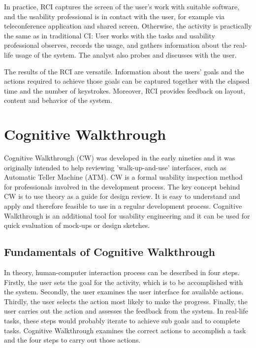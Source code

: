 \documentclass[12pt,a4paper,oneside,pdftex]{report}
\begin{document}
In practice, RCI captures the screen of the user's work with suitable software, and the usability professional is in contact with the user, for example via teleconference application and shared screen. Otherwise, the activity is practically the same as in traditional CI: User works with the tasks and usability professional observes, records the usage, and gathers information about the real-life usage of the system. The analyst also probes and discusses with the user. \citep{RefWorks:32}

The results of the RCI are versatile. Information about the users' goals and the actions required to achieve those goals can be captured together with the elapsed time and the number of keystrokes. Moreover, RCI provides feedback on layout, content and behavior of the system. \citep{RefWorks:32}
 
\section{Cognitive Walkthrough}
\label{sec:cognitivewalkthrough}

Cognitive Walkthrough (CW) was developed in the early nineties and it was originally intended to help reviewing 'walk-up-and-use' interfaces, such as Automatic Teller Machine (ATM). CW is a formal usability inspection method for professionals involved in the development process. The key concept behind CW is to use theory as a guide for design review. It is easy to understand and apply and therefore feasible to use in a regular development process. \citep{RefWorks:19, RefWorks:18} Cognitive Walkthrough is an additional tool for usability engineering and it can be used for quick evaluation of mock-ups or design sketches. \citep{RefWorks:34}

\subsection{Fundamentals of Cognitive Walkthrough}

In theory, human-computer interaction process can be described in four steps. Firstly, the user sets the goal for the activity, which is to be accomplished with the system. Secondly, the user examines the user interface for available actions. Thirdly, the user selects the action most likely to make the progress. Finally, the user carries out the action and assesses the feedback from the system. In real-life tasks, these steps would probably iterate to achieve sub goals and to complete tasks. Cognitive Walkthrough examines the correct actions to accomplish a task and the four steps to carry out those actions. \citep{RefWorks:34}
\end{document}
